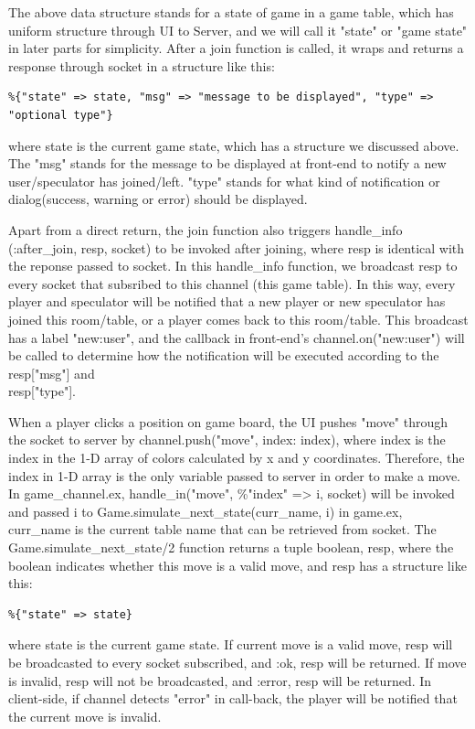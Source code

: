   The above data structure stands for a state of game in a game table, 
  which has uniform structure through UI to Server, and we will call it "state" 
  or "game state" in later parts for simplicity. After a join function is called, 
  it wraps and returns a response through socket in a structure like this: 
\begin{lstlisting}
%{"state" => state, "msg" => "message to be displayed", "type" => "optional type"}
\end{lstlisting}

where state is the current game state, which has a structure we discussed above. 
The "msg" stands for the message to be displayed at front-end to notify a new 
user/speculator has joined/left. "type" stands for what kind of notification or 
dialog(success, warning or error) should be displayed.

Apart from a direct return, the join function also triggers handle\_info
({:after\_join, resp}, socket) to be invoked after joining, where resp is 
identical with the reponse passed to socket. In this handle\_info function, 
we broadcast resp to every socket that subsribed to this channel 
(this game table). In this way, every player and speculator will be notified 
that a new player or new speculator has joined this room/table, or a player 
comes back to this room/table. This broadcast has a label "new:user", and the 
callback in front-end's channel.on("new:user") will be called to determine 
how the notification will be executed according to the resp["msg"] and \\
resp["type"].

When a player clicks a position on game board, the UI pushes "move" through 
the socket to server by channel.push("move", {index: index}), where index is 
the index in the 1-D array of colors calculated by x and y coordinates. 
Therefore, the index in 1-D array is the only variable passed to server 
in order to make a move. In game\_channel.ex, handle\_in("move", \%{"index" => i}, 
socket) will be invoked and passed i to Game.simulate\_next\_state(curr\_name, i) 
in game.ex, curr\_name is the current table name that can be retrieved from socket.
The Game.simulate\_next\_state/2 function returns a tuple {boolean, resp}, 
where the boolean indicates whether this move is a valid move, and resp has a 
structure like this:
 \begin{lstlisting}
%{"state" => state}
 \end{lstlisting}

where state is the current game state. If current move is a valid move, 
resp will be broadcasted to every socket subscribed, and {:ok, resp} will 
be returned. If move is invalid, resp will not be broadcasted, and {:error, 
resp} will be returned. In client-side, if channel detects "error" in call-back, 
the player will be notified that the current move is invalid.

